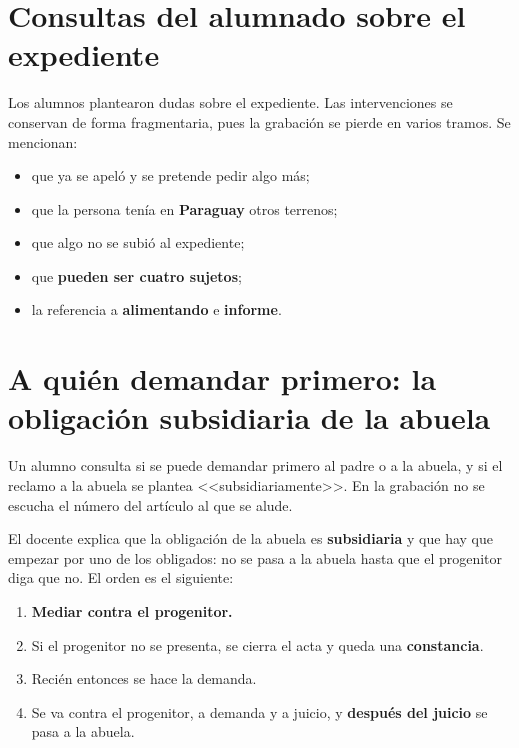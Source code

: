 \documentclass[12pt,oneside]{book}
\begin{document}
\section{Consultas del alumnado sobre el expediente}

Los alumnos plantearon dudas sobre el expediente. Las intervenciones se conservan de forma fragmentaria, pues la grabación se pierde en varios tramos. Se mencionan:

\begin{itemize}
    \item que ya se apeló y se pretende pedir algo más;
    \item que la persona tenía en \textbf{Paraguay} otros terrenos;
    \item que algo no se subió al expediente;
    \item que \textbf{pueden ser cuatro sujetos};
    \item la referencia a \textbf{alimentando} e \textbf{informe}.
\end{itemize}


\section{A quién demandar primero: la obligación subsidiaria de la abuela}

Un alumno consulta si se puede demandar primero al padre o a la abuela, y si el reclamo a la abuela se plantea <<subsidiariamente>>. En la grabación no se escucha el número del artículo al que se alude.


El docente explica que la obligación de la abuela es \textbf{subsidiaria} y que hay que empezar por uno de los obligados: no se pasa a la abuela hasta que el progenitor diga que no. El orden es el siguiente:

\begin{enumerate}
    \item \textbf{Mediar contra el progenitor.}
    \item Si el progenitor no se presenta, se cierra el acta y queda una \textbf{constancia}.
    \item Recién entonces se hace la demanda.
    \item Se va contra el progenitor, a demanda y a juicio, y \textbf{después del juicio} se pasa a la abuela.
\end{enumerate}
\end{document}
